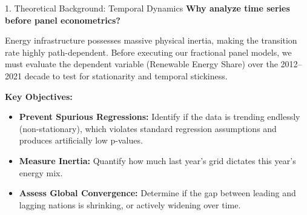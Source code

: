 \documentclass[aspectratio=169]{beamer}
\begin{document}
\begin{frame}{1. Theoretical Background: Temporal Dynamics}
  \textbf{Why analyze time series before panel econometrics?}
  \vspace{0.2cm}
  
  Energy infrastructure possesses massive physical inertia, making the transition rate highly path-dependent. 
  Before executing our fractional panel models, we must evaluate the dependent variable (Renewable Energy Share) over the 2012--2021 decade to test for stationarity and temporal stickiness.
  \vspace{0.3cm}
  
  \textbf{Key Objectives:}
  \begin{itemize}
      \item \textbf{Prevent Spurious Regressions:} Identify if the data is trending endlessly (non-stationary), which violates standard regression assumptions and produces artificially low p-values.
      \item \textbf{Measure Inertia:} Quantify how much last year's grid dictates this year's energy mix.
      \item \textbf{Assess Global Convergence:} Determine if the gap between leading and lagging nations is shrinking, or actively widening over time.
  \end{itemize}
\end{frame}
\end{document}
